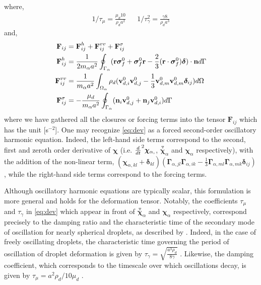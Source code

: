 where,
\begin{align}
    1/\tau_\mu 
    =
    \frac{\mu_d 10}{\rho_d a^2}  
    &&
    1/\tau_\gamma^2
    = 
    \frac{\gamma 8 }{\rho_d a^3} 
\end{align}
and,
\begin{align}
    \textbf{F}_{ij}
    &= 
    \textbf{F}_{ij}^h
    +\textbf{F}_{ij}^{vv}
    + \textbf{F}_{ij}^{\sigma}\\
    \textbf{F}_{ij}^h
    &= \frac{1}{2m_\alpha a^2}\oint_{\Gamma_{\alpha}} (\textbf{r}\bm\sigma_f^0 + \bm\sigma_f^0\textbf{r} - \frac{2}{3}(\textbf{r}\cdot \bm\sigma_f^0) \bm\delta)\cdot \textbf{n} d\Gamma \\
    \textbf{F}_{ij}^{vv}
    &= 
    \frac{1}{m_\alpha a^2}\int_{\Omega_{\alpha}} \rho_d(\textbf{v}_{d,i}^0\textbf{v}_{d,j}^0 - \frac{1}{3}\textbf{v}_{d,m}^0\textbf{v}_{d,m}^0 \bm\delta_{ij})  d\Omega\\
    \textbf{F}_{ij}^{\sigma}
    &= - \frac{\mu_d}{m_\alpha a^2} \oint_{\Gamma_{\alpha}} (\textbf{n}_i \textbf{v}_{d,j}^0 + \textbf{n}_j \textbf{v}_{d,i}^0) d\Gamma\nonumber
\end{align}
where we have gathered all the closures or forcing terms into the tensor $\textbf{F}_{ij}$ which has the unit [s$^{-2}$]. 
One may recognize \ref{eq:dev} as a forced second-order oscillatory harmonic equation.
Indeed, the left-hand side terms correspond to the second, first and zeroth order derivative of $\bm\chi$ (i.e. $\frac{d}{dt}^2 \bm\chi_{\alpha,}$, $\overset{ \triangledown  }{\bm\chi}_\alpha$ and $\bm\chi_\alpha$ respectively), with the addition of the non-linear term, $ (\bm\chi_{\alpha,kl}+\bm\delta_{kl}) 
(\bm\Gamma_{\alpha,jl}\bm\Gamma_{\alpha,ik}  
- \frac{1}{3}
\bm\Gamma_{\alpha,ml}\bm\Gamma_{\alpha,mk}  
\bm\delta_{ij}
)$, while the right-hand side terms correspond to the forcing terms. 

Although oscillatory harmonic equations are typically scalar, this formulation is more general and holds for the deformation tensor. 
Notably, the coefficients $\tau_\mu$ and $\tau_\gamma$ in \ref{eq:dev} which appear in front of $\overset{ \triangledown  }{\bm\chi}_\alpha$ and $\bm\chi_\alpha$ respectively, correspond precisely to the damping ratio and the characteristic time of the secondary mode of oscillation for nearly spherical droplets, as described by \citep{lamb1924hydrodynamics}. 
Indeed, in the case of freely oscillating droplets, the characteristic time governing the period of oscillation of droplet deformation is given by $\tau_\gamma = \sqrt{\frac{a^3\rho_d}{8 \gamma }}$ \citep{lamb1924hydrodynamics}. 
Likewise, the damping coefficient, which corresponds to the timescale over which oscillations decay, is given by  $\tau_\mu = a^2\rho_d/10 \mu_d$ \citep{lamb1924hydrodynamics}. 


